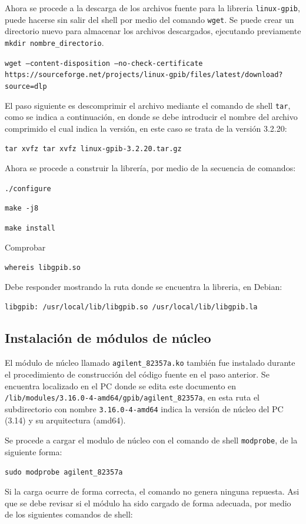 \documentclass[paper=letter,oneside,fontsize=11pt, parskip=full]{scrartcl}
\begin{document}
		Ahora se procede a la descarga de los archivos fuente para la libreria \texttt{linux-gpib}, puede hacerse sin salir del shell por medio del comando \texttt{wget}. Se puede crear un directorio nuevo para almacenar los archivos descargados, ejecutando previamente \texttt{mkdir nombre\_directorio}.
		
		\texttt{wget --content-disposition --no-check-certificate https://sourceforge.net/projects/linux-gpib/files/latest/download?source=dlp}
		
		El paso siguiente es descomprimir el archivo mediante el comando de shell \texttt{tar}, como se indica a continuación, en donde se debe introducir el nombre del archivo comprimido el cual indica la versión, en este caso se trata de la versión 3.2.20:
		
		\texttt{tar xvfz tar xvfz linux-gpib-3.2.20.tar.gz}
		
		Ahora se procede a construir la librería, por medio de la secuencia de comandos:
		
		\texttt{./configure}
		
		\texttt{make -j8} 
		
		\texttt{make install}
		
		Comprobar
		
		\texttt{whereis libgpib.so}
		
		Debe responder mostrando la ruta donde se encuentra la libreria, en Debian:
		
		\texttt{libgpib: /usr/local/lib/libgpib.so /usr/local/lib/libgpib.la}	
		
		\subsection{Instalación de módulos de núcleo}
		
		El módulo de núcleo llamado \texttt{agilent\_82357a.ko} también fue instalado durante el procedimiento de construcción del código fuente en el paso anterior. Se encuentra localizado en el PC donde se edita este documento en \texttt{/lib/modules/3.16.0-4-amd64/gpib/agilent\_82357a}, en esta ruta el subdirectorio con nombre \texttt{3.16.0-4-amd64} indica la versión de núcleo del PC (3.14) y su arquitectura (amd64). 
		
		Se procede a cargar el modulo de núcleo con el comando de shell \texttt{modprobe}, de la siguiente forma:
		
		\texttt{sudo modprobe agilent\_82357a}
		
		Si la carga ocurre de forma correcta, el comando no genera ninguna repuesta. Asi que se debe revisar si el módulo ha sido cargado de forma adecuada, por medio de los siguientes comandos de shell:
		
\end{document}
